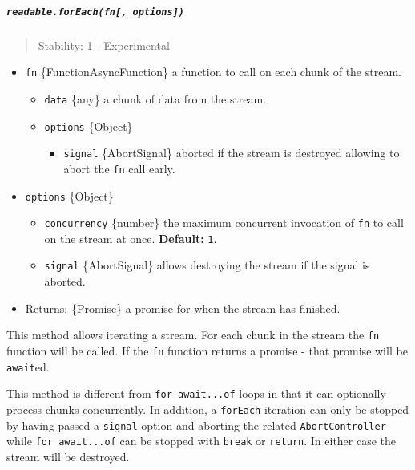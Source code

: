 \subparagraph{\texorpdfstring{\texttt{readable.forEach(fn{[},\ options{]})}}{readable.forEach(fn{[}, options{]})}}\label{readable.foreachfn-options}

\begin{quote}
Stability: 1 - Experimental
\end{quote}

\begin{itemize}
\tightlist
\item
  \texttt{fn} \{Function\textbar AsyncFunction\} a function to call on
  each chunk of the stream.

  \begin{itemize}
  \tightlist
  \item
    \texttt{data} \{any\} a chunk of data from the stream.
  \item
    \texttt{options} \{Object\}

    \begin{itemize}
    \tightlist
    \item
      \texttt{signal} \{AbortSignal\} aborted if the stream is destroyed
      allowing to abort the \texttt{fn} call early.
    \end{itemize}
  \end{itemize}
\item
  \texttt{options} \{Object\}

  \begin{itemize}
  \tightlist
  \item
    \texttt{concurrency} \{number\} the maximum concurrent invocation of
    \texttt{fn} to call on the stream at once. \textbf{Default:}
    \texttt{1}.
  \item
    \texttt{signal} \{AbortSignal\} allows destroying the stream if the
    signal is aborted.
  \end{itemize}
\item
  Returns: \{Promise\} a promise for when the stream has finished.
\end{itemize}

This method allows iterating a stream. For each chunk in the stream the
\texttt{fn} function will be called. If the \texttt{fn} function returns
a promise - that promise will be \texttt{await}ed.

This method is different from \texttt{for\ await...of} loops in that it
can optionally process chunks concurrently. In addition, a
\texttt{forEach} iteration can only be stopped by having passed a
\texttt{signal} option and aborting the related \texttt{AbortController}
while \texttt{for\ await...of} can be stopped with \texttt{break} or
\texttt{return}. In either case the stream will be destroyed.

